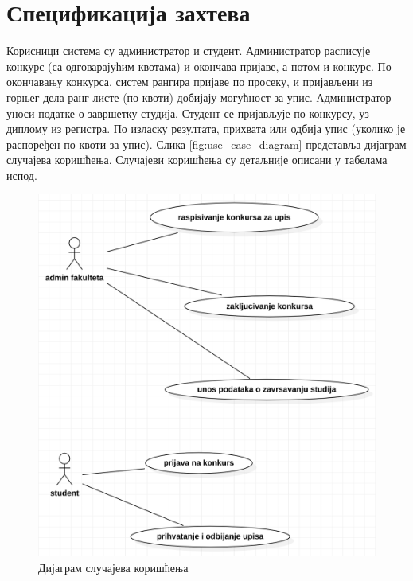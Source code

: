 \documentclass[a4paper]{article}
\begin{document}
\section*{Спецификација захтева}

Корисници система су администратор и студент. Администратор расписује конкурс (са одговарајућим квотама) и окончава пријаве,
а потом и конкурс. По окончавању конкурса, систем рангира пријаве по просеку, и пријављени из горњег дела ранг листе
(по квоти) добијају могућност за упис. Администратор уноси податке о завршетку студија. Студент се пријављује по конкурсу, уз диплому из регистра. По изласку резултата, прихвата или одбија упис (уколико је распоређен по квоти за упис). Слика \autoref{fig:use_case_diagram} представља дијаграм случајева коришћења. Случајеви коришћења су детаљније описани у табелама испод.

\begin{figure}[H]
    \centering
    \includegraphics{images/use_case_diagram.png}
    \caption{Дијаграм случајева коришћења}
    \label{fig:use_case_diagram}
\end{figure}
\end{document}
